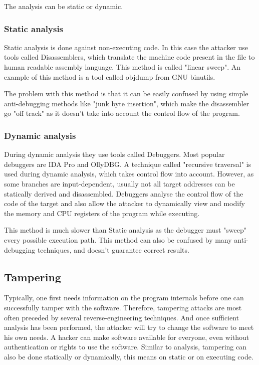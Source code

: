 \documentclass[a4paper,12pt]{article}
\begin{document}
The analysis can be static or dynamic.

\subsubsection{Static analysis}
Static analysis is done against non-executing code. In this case the attacker
use tools called Disassemblers, which translate the machine code present in the
file to human readable assembly language. This method is called "linear sweep".
An example of this method is a tool called objdump from GNU binutils.

The problem with this method is that it can be easily confused by using simple
anti-debugging methods like "junk byte insertion", which make the disassembler
go "off track" as it doesn't take into account the control flow of the program.

\subsubsection{Dynamic analysis}
During dynamic analysis they use tools called Debuggers. Most popular debuggers
are IDA Pro and OllyDBG. A technique called "recursive traversal" is used
during dynamic analysis, which takes control flow into account. However, as
some branches are input-dependent, usually not all target addresses can be
statically derived and disassembled. Debuggers analyse the control flow of the
code of the target and also allow the attacker to dynamically view and modify
the memory and CPU registers of the program while executing.

This method is much slower than Static analysis as the debugger must "sweep"
every possible execution path. This method can also be confused by many
anti-debugging techniques, and doesn't guarantee correct results.

\subsection{Tampering}
Typically,
one first needs information on the program internals before one can successfully
tamper with the software. Therefore, tampering attacks are most often preceded
by several reverse-engineering techniques. And once sufficient analysis has been
performed, the attacker will try to change the software to meet his own needs.
A hacker can make software available for everyone, even without authentication
or rights to use the software. Similar to analysis, tampering can also be done
statically or dynamically, this means on static or on executing code.
\end{document}

